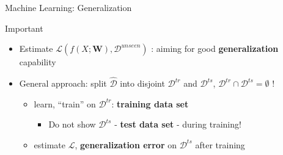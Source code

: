 \begin{frame}{Machine Learning: Generalization}
\protect\hypertarget{machine-learning-generalization-1}{}
\begin{block}{Important}
\protect\hypertarget{important-1}{}
\begin{itemize}
\tightlist
\item
  Estimate \(\mathcal{L}(f(X;\mathbf{W}),\mathcal{D}^{unseen})\) :
  aiming for good \textbf{generalization} capability
\end{itemize}
\end{block}

\begin{itemize}
\tightlist
\item
  General approach: split \(\mathcal{\hat{D}}\) into disjoint
  \(\mathcal{D}^{tr}\) and \(\mathcal{D}^{ts}\),
  \(\mathcal{D}^{tr} \cap \mathcal{D}^{ts} = \emptyset\) !

  \begin{itemize}
  \tightlist
  \item
    learn, ``train'' on \(\mathcal{D}^{tr}\): \textbf{training data set}

    \begin{itemize}
    \tightlist
    \item
      \alert{Do not show} \(\mathcal{D}^{ts}\) - \textbf{test data set}
      - during training!
    \end{itemize}
  \item
    estimate \(\mathcal{L}\), \textbf{generalization error} on
    \(\mathcal{D}^{ts}\) after training
  \end{itemize}
\end{itemize}

\end{frame}

